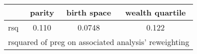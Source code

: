 \begin{tabular}{l*{3}{c}}
\toprule
            &\multicolumn{1}{c}{parity}&\multicolumn{1}{c}{birth space}&\multicolumn{1}{c}{wealth quartile}\\
\midrule
\midrule
rsq         &       0.110&      0.0748&       0.122\\
\bottomrule
\multicolumn{4}{l}{\footnotesize rsquared of preg on associated analysis' reweighting}\\
\end{tabular}
